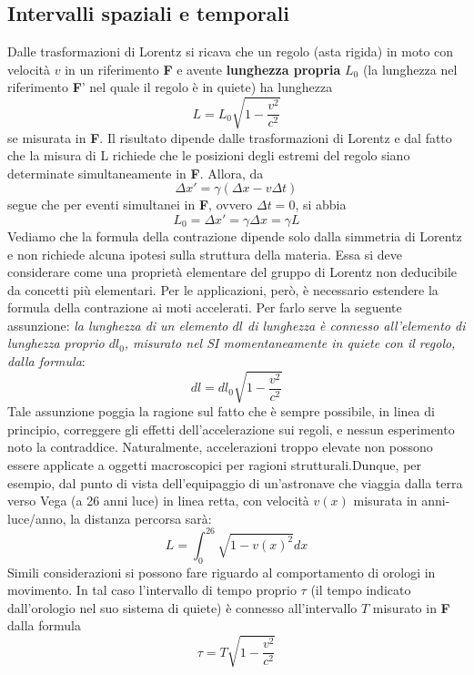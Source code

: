 \documentclass[a4paper,11pt]{book}
\theoremstyle{plain}
\theoremstyle{definition}
\begin{document}
\subsection{Intervalli spaziali e temporali}
Dalle trasformazioni di Lorentz si ricava che un regolo (asta rigida) in moto con velocità $v$ in un riferimento \textbf{F}  e avente \textbf{lunghezza propria} $L_0$ (la lunghezza nel riferimento \textbf{F}' nel quale il regolo è in quiete) ha lunghezza
\begin{equation}\label{eq:lunghezze}
L=L_0 \sqrt{1-\frac{v^2}{c^2}}
\end{equation}
se misurata in \textbf{F}. Il risultato dipende dalle trasformazioni di Lorentz e dal fatto che la misura di L richiede che le posizioni degli estremi del regolo siano determinate simultaneamente in \textbf{F}. Allora, da
\[
\Delta x' = \gamma (\Delta x-v\Delta t)
\] 
segue che per eventi simultanei in \textbf{F}, ovvero $\Delta t=0$, si abbia
\[
L_0=\Delta x' = \gamma \Delta x = \gamma L
\]
Vediamo che la formula della contrazione dipende solo dalla simmetria di Lorentz e non richiede alcuna ipotesi sulla struttura della materia. Essa si deve considerare come una proprietà elementare del gruppo di Lorentz non deducibile da concetti più elementari. Per le applicazioni, però, è necessario estendere la formula della contrazione ai moti accelerati. Per farlo serve la seguente assunzione: \emph{la lunghezza di un elemento $dl$ di lunghezza è connesso all’elemento di lunghezza proprio $dl_0$, misurato nel SI momentaneamente in quiete con il regolo, dalla formula}:
\[
dl=dl_0 \sqrt{1-\frac{v^2}{c^2}}
\]
Tale assunzione poggia la ragione sul fatto che è sempre possibile, in linea di principio, correggere gli effetti dell’accelerazione sui regoli, e nessun esperimento noto la contraddice. Naturalmente, accelerazioni troppo elevate non possono essere applicate a oggetti macroscopici per ragioni strutturali.Dunque, per esempio, dal punto di vista dell’equipaggio di un’astronave che viaggia dalla terra verso Vega (a 26 anni luce) in linea retta, con velocità $v(x)$ misurata in anni-luce/anno, la distanza percorsa sarà:
\[
L=\int_0^{26} \sqrt{1-v(x)^2}dx
\]
Simili considerazioni si possono fare riguardo al comportamento di orologi in movimento. In tal caso l’intervallo di tempo proprio $\tau$ (il tempo indicato dall’orologio nel suo sistema di quiete) è connesso all’intervallo $T$ misurato in \textbf{F} dalla formula
\begin{equation}\label{eq:tempi}
\tau=T\sqrt{1-\frac{v^2}{c^2}}
\end{equation}
\end{document}
